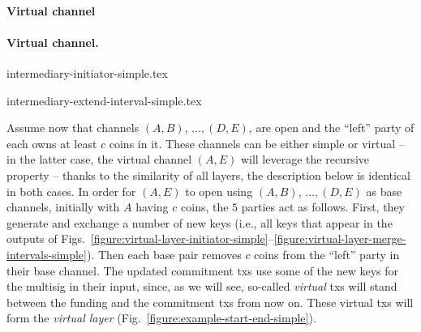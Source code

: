   \makeatletter%
    {\paragraph{Virtual channel}}%
    {\paragraph{Virtual channel.}}%
  \makeatother%
  \addtolength{\intextsep}{-15pt}
  \begin{figure*}[!htbp]
    \begin{minipage}{.44\textwidth}
    {intermediary-initiator-simple.tex}
    \caption{$A$--$E$ virtual channel: $D$'s initiator transaction. Spends the
    funding outputs of the $C$--$D$ and $D$--$E$ channels. $D$ can use it if neither
    $C$ nor $E$ have published a virtual transaction yet. $A_V$: $A$'s
    ``virtual'' key. $A_b$: $A$'s ``bridge'' key.}
    \label{figure:virtual-layer-initiator-simple}
    \end{minipage}\hspace{10pt}%
    \begin{minipage}{.53\textwidth}
    {intermediary-extend-interval-simple.tex}
    \caption{$A$--$E$ virtual channel: One of $C$'s extend-interval
    transactions. Spends the virtual output of $D$'s
    initiator transaction and the funding output of the $B$--$C$ channel. $C$ can
    use it if $D$ has already published its initiator transaction and $B$ has
    not published a virtual transaction yet.}
    \label{figure:virtual-layer-extend-interval-simple}
    \end{minipage}
  \end{figure*}
  \addtolength{\intextsep}{15pt}

  Assume now that channels $(A, B)$, $\dots,(D, E)$, are open and the ``left''
  party of each owns at least $c$ coins in it. These channels can be either
  simple or virtual -- in the latter case, the virtual channel $(A, E)$ will
  leverage the recursive property --
  thanks to the similarity of all layers, the description below is identical in
  both cases. In order for $(A, E)$ to open using $(A, B)$,
  $\dots,(D, E)$ as base channels, initially with $A$ having $c$ coins, the
  $5$ parties act as follows. First, they generate and exchange a number of new
  keys (i.e., all keys that appear in the outputs of
  Figs.~\ref{figure:virtual-layer-initiator-simple}--\ref{figure:virtual-layer-merge-intervals-simple}). Then
  each base pair removes $c$ coins from the ``left'' party in
  their base channel. The updated commitment txs use some of the new
  keys for the multisig in their input, since, as we will see, so-called \emph{virtual}
  txs will stand between the funding and the commitment txs from now on. These
  virtual txs will form the \emph{virtual layer} (Fig.~\ref{figure:example-start-end-simple}).

